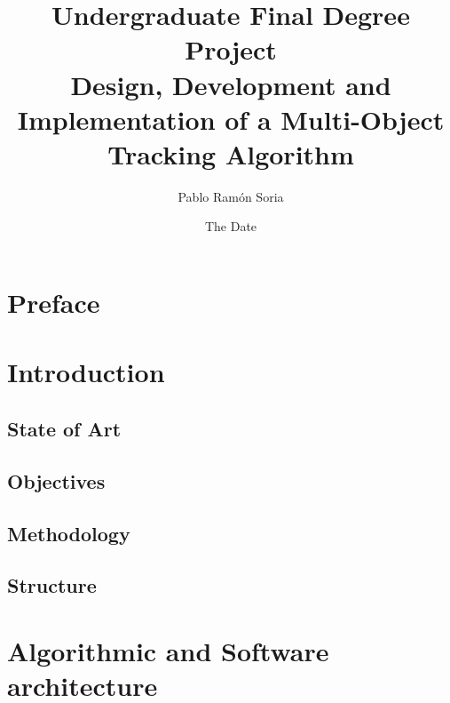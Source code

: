 \documentclass{book} %
\begin{document}
\frontmatter
\title{Undergraduate Final Degree Project \\ Design, Development and Implementation of a Multi-Object Tracking Algorithm}
\author{Pablo Ram\'on Soria}
\date{The Date}
\maketitle

\tableofcontents

\chapter*{Preface}


\chapter{Introduction}
\section{State of Art}


\section{Objectives}


\section{Methodology}


\section{Structure}



\mainmatter


\chapter{Algorithmic and Software architecture}
\end{document}
